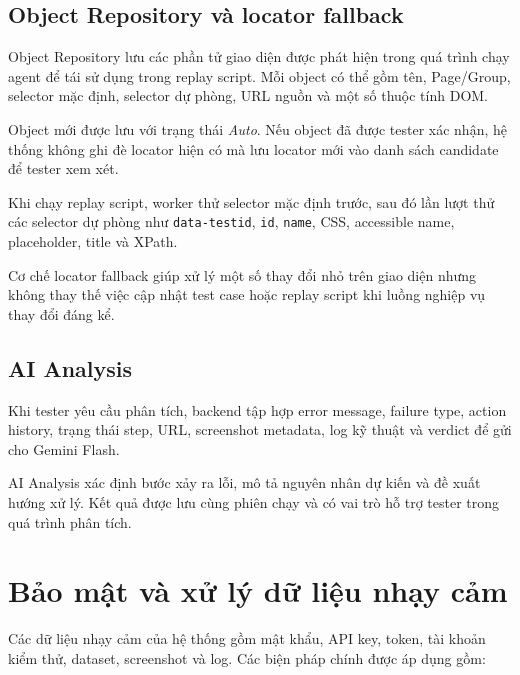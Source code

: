 \subsection{Object Repository và locator fallback}

Object Repository lưu các phần tử giao diện được phát hiện trong quá trình chạy agent để tái sử dụng trong replay script. Mỗi object có thể gồm tên, Page/Group, selector mặc định, selector dự phòng, URL nguồn và một số thuộc tính DOM.

Object mới được lưu với trạng thái \textit{Auto}. Nếu object đã được tester xác nhận, hệ thống không ghi đè locator hiện có mà lưu locator mới vào danh sách candidate để tester xem xét.

Khi chạy replay script, worker thử selector mặc định trước, sau đó lần lượt thử các selector dự phòng như \texttt{data-testid}, \texttt{id}, \texttt{name}, CSS, accessible name, placeholder, title và XPath.

Cơ chế locator fallback giúp xử lý một số thay đổi nhỏ trên giao diện nhưng không thay thế việc cập nhật test case hoặc replay script khi luồng nghiệp vụ thay đổi đáng kể.

\subsection{AI Analysis}

Khi tester yêu cầu phân tích, backend tập hợp error message, failure type, action history, trạng thái step, URL, screenshot metadata, log kỹ thuật và verdict để gửi cho Gemini Flash.

AI Analysis xác định bước xảy ra lỗi, mô tả nguyên nhân dự kiến và đề xuất hướng xử lý. Kết quả được lưu cùng phiên chạy và có vai trò hỗ trợ tester trong quá trình phân tích.

\section{Bảo mật và xử lý dữ liệu nhạy cảm}

Các dữ liệu nhạy cảm của hệ thống gồm mật khẩu, API key, token, tài khoản kiểm thử, dataset, screenshot và log. Các biện pháp chính được áp dụng gồm:

